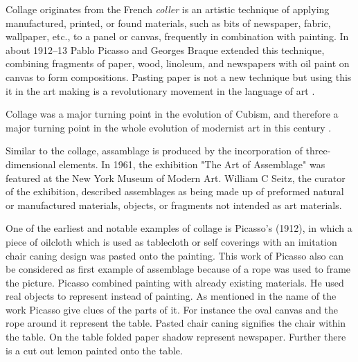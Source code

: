 Collage originates from the French \textit{coller} is an artistic technique of applying manufactured, printed, or found materials, such as bits of newspaper, fabric, wallpaper, etc., to a panel or canvas, frequently in combination with painting. In about 1912–13 Pablo Picasso and Georges Braque extended this technique, combining fragments of paper, wood, linoleum, and newspapers with oil paint on canvas to form compositions. Pasting paper is not a new technique but using this it in the art making is a revolutionary movement in the  language of art \cite{waldman1992collage}. 

Collage was a major turning point in the evolution of Cubism, and therefore a major turning point in the whole evolution of modernist art in this century \cite{greenberg1984collage}. 

Similar to the collage, assamblage is produced by the incorporation of three-dimensional elements. In 1961, the exhibition "The Art of Assemblage" was featured at the New York Museum of Modern Art. William C Seitz, the curator of the exhibition, described assemblages as being made up of preformed natural or manufactured materials, objects, or fragments not intended as art materials. 


One of the earliest and notable examples of collage is Picasso’s  (1912), in which a piece of oilcloth which is used as tablecloth or self coverings with an imitation chair caning design was pasted onto the painting. This work of Picasso also can be considered as first example of assemblage because of a rope was used to frame the picture. Picasso combined painting with already existing materials. He used real objects to represent instead of painting. As mentioned in the name of the work Picasso give clues of the parts of it. For instance the oval canvas and the rope around it represent the table. Pasted chair caning signifies the chair within the table. On the table folded paper shadow represent newspaper. Further there is a cut out lemon painted onto the table.  

